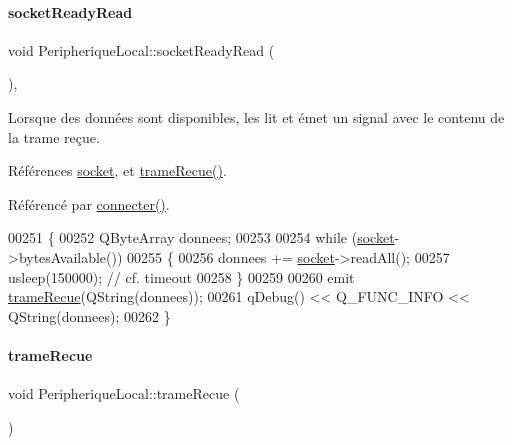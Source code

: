 \mbox{\label{class_peripherique_local_a48840475209b5cabcf60e3176de63b92}} 
\paragraph{\texorpdfstring{socket\+Ready\+Read}{socketReadyRead}}
{\footnotesize\ttfamily void Peripherique\+Local\+::socket\+Ready\+Read (\begin{DoxyParamCaption}{ }\end{DoxyParamCaption})\hspace{0.3cm}{\ttfamily [protected]}, {\ttfamily [slot]}}

Lorsque des données sont disponibles, les lit et émet un signal avec le contenu de la trame reçue. 

Références \hyperlink{class_peripherique_local_a0058bf8367b4b8f907838b83a9150c07}{socket}, et \hyperlink{class_peripherique_local_af980614027f938565b318eb1dfd579c5}{trame\+Recue()}.



Référencé par \hyperlink{class_peripherique_local_af2e7f023f8ed72ebc1d36e66c440ceca}{connecter()}.


\begin{DoxyCode}
00251 \{    
00252     QByteArray donnees;
00253 
00254     \textcolor{keywordflow}{while} (\hyperlink{class_peripherique_local_a0058bf8367b4b8f907838b83a9150c07}{socket}->bytesAvailable())
00255     \{
00256         donnees += \hyperlink{class_peripherique_local_a0058bf8367b4b8f907838b83a9150c07}{socket}->readAll();
00257         usleep(150000); \textcolor{comment}{// cf. timeout}
00258     \}
00259 
00260     emit \hyperlink{class_peripherique_local_af980614027f938565b318eb1dfd579c5}{trameRecue}(QString(donnees));
00261     qDebug() << Q\_FUNC\_INFO << QString(donnees);
00262 \}
\end{DoxyCode}
\mbox{\label{class_peripherique_local_af980614027f938565b318eb1dfd579c5}} 
\paragraph{\texorpdfstring{trame\+Recue}{trameRecue}}
{\footnotesize\ttfamily void Peripherique\+Local\+::trame\+Recue (\begin{DoxyParamCaption}\item[{Q\+String}]{ }\end{DoxyParamCaption})\hspace{0.3cm}{\ttfamily [signal]}}



